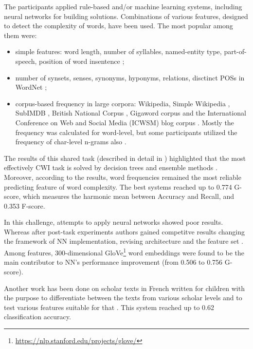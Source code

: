The participants applied rule-based and/or
machine learning systems, including neural networks for building solutions.
Combinations of various features, designed
to detect the complexity of words, have been used. The most popular among them were: 

\begin{itemize}
    \item simple features: word length, number of
syllables, named-entity type, part-of-speech, position of word insentence \citep{Bingel-SemEval2016};
    \item number of synsets, senses, synonyms, hyponyms, relations, disctinct POSs in WordNet \citep{Ronzano-SemEval2016};
    
    \item corpus-based frequency in large corpora: Wikipedia, Simple Wikipedia \citep{Kauchak-2013}, SubIMDB \citep{Paetzold-SemEval2016solution}, British National Corpus \citep{Ronzano-SemEval2016}, Gigaword corpus and the International Conference on Web and Social Media (ICWSM) blog corpus \citep{Brooke-SemEval2016}. Mostly the frequency was calculated for word-level, but some participants utilized the frequency of char-level n-grams also \citep{Bingel-SemEval2016}.
\end{itemize}


The results of this shared task (described in detail in \cite{Paetzold-SemEval2016overview}) highlighted that the most effectively CWI task is solved by decision trees \citep{Malmasi-SemEval2016} and ensemble methods \citep{Paetzold-SemEval2016solution, Ronzano-SemEval2016}. Moreover, according to the results, word frequencies remained the most reliable predicting feature of word complexity. The best systems reached up to 0.774 G-score, which measures the harmonic mean between Accuracy and Recall, and 0.353 F-score. 

In this challenge, attempts to apply neural networks showed poor results. Whereas after post-task experiments authors gained competitve results changing the framework of NN implementation, revising architecture and the feature set \citep{Bingel-SemEval2016}. Among features, 300-dimensional GloVe\footnote{\url{https://nlp.stanford.edu/projects/glove/}} word embeddings were found to be the main contributor to NN's performance improvement (from 0.506 to 0.756 G-score). 

Another work has been done on scholar texts in French written for
children with the purpose to differentiate between the texts from
various scholar levels and to test various features suitable for that
\citep{Gala-ELEX2013}. This system reached up to 0.62 classification
accuracy.


